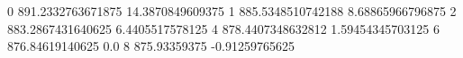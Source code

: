 0 891.2332763671875 14.3870849609375
1 885.5348510742188 8.68865966796875
2 883.2867431640625 6.4405517578125
4 878.4407348632812 1.59454345703125
6 876.84619140625 0.0
8 875.93359375 -0.91259765625
